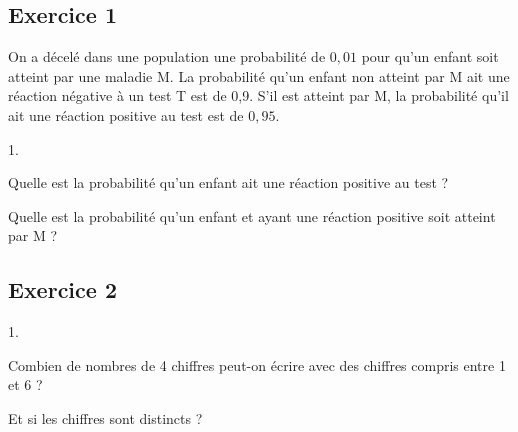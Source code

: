\documentclass[11pt]{article}%
\begin{document}
\subsection*{Exercice 1}
\noindent
On a décelé dans une population une probabilité de $0,01$ pour qu'un
enfant soit atteint par une maladie M. La probabilité qu'un enfant
non atteint par M ait une réaction négative à un test T est de
0,9. S'il est atteint par M, la probabilité qu'il ait une réaction
positive au test est de $0,95$.
\begin{noliste}{1.}
 \item Quelle est la probabilité qu'un enfant %
 ait une réaction positive au test ?
 \item Quelle est la probabilité qu'un enfant %
 et ayant une réaction positive soit atteint par M ?
\end{noliste}


\subsection*{Exercice 2}
\noindent
\begin{noliste}{1.}
 \item Combien de nombres de 4 chiffres peut-on écrire avec des 
 chiffres compris entre 1 et 6 ?
 \item Et si les chiffres sont distincts ?
\end{noliste}
\end{document}
